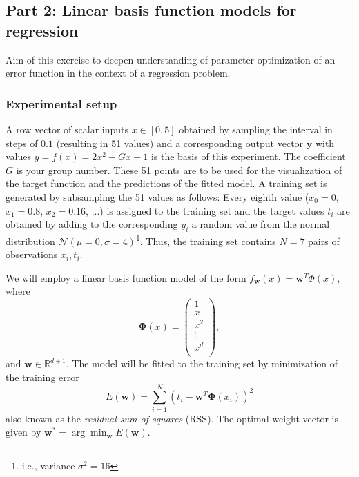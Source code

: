 \documentclass[a4]{article}
\begin{document}
\subsection{Part 2: Linear basis function models for regression}

Aim of this exercise to deepen understanding of parameter optimization of an error function in the context of a regression problem.

\subsubsection{Experimental setup}
\label{sec:exp}
A row vector of scalar inputs $x \in [0,5]$ obtained by sampling the interval in steps of $0.1$ (resulting in 51 values) and a corresponding output vector $\mathbf{y}$ with values $y = f(x) = 2x^2-Gx+1$ is the basis of this experiment. The coefficient $G$ is your group number. These 51 points are to be used for the visualization of the target function and the predictions of the fitted model.
A training set is generated by subsampling the 51 values as follows: Every eighth value ($x_0 = 0$, $x_1 = 0.8$, $x_2 = 0.16$, ...) is assigned to the training set and the target values $t_i$ are obtained by adding to the corresponding $y_i$ a random value from the normal distribution $\mathcal{N}(\mu = 0,\sigma = 4)$\footnote{i.e., variance $\sigma^2 = 16$}. Thus, the training set contains $N = 7$ pairs of observations $x_i, t_i$. 

We will employ a linear basis function model of the form $f_{\mathbf w}(x) = {\mathbf w}^T{\Phi}(x)$, where\begin{equation} \nonumber
{\mathbf \Phi}(x) = \left(
\begin{array}{c} 1\\ x \\ x^2 \\ \vdots \\ x^d \\ \end{array}\right),
\end{equation} 
and ${\mathbf w} \in \mathbb{R}^{d+1}$. The model will be fitted to the training set by minimization of the training error 
\begin{equation}
E({\mathbf w}) = \sum_{i = 1}^N(t_i - {\mathbf w}^T{\mathbf \Phi}(x_i))^2
\end{equation} 
also known as the \emph{residual sum of squares} (RSS). The optimal weight vector is given by ${\mathbf w}^* = \arg\min_{\mathbf w} E({\mathbf w})$.
\end{document}
